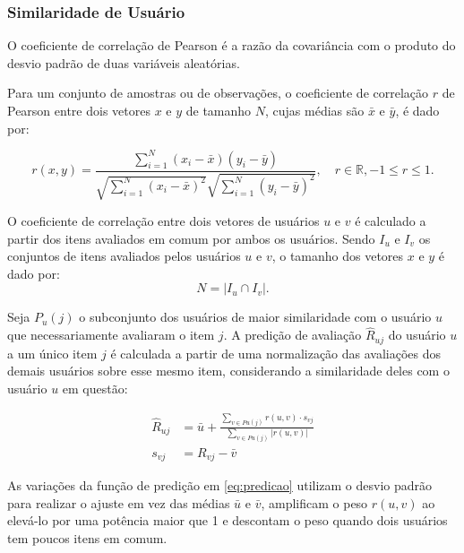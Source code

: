 \subsubsection{Similaridade de Usuário}
O coeficiente de correlação de Pearson é a razão da covariância com o produto
do desvio padrão de duas variáveis aleatórias.

Para um conjunto de amostras ou de observações, o coeficiente de
correlação $r$ de Pearson entre dois vetores $x$ e $y$ de tamanho $N$, cujas
médias são $\bar{x}$ e $\bar{y}$, é dado por:

\begin{equation}    
    r(x,y) = \frac{\sum_{i=1}^{N}(x_i - \bar{x})(y_i - \bar{y})}{\sqrt{\sum_{i=1}^{N}(x_i - \bar{x})^2} \sqrt{\sum_{i=1}^{N}(y_i - \bar{y})^2}}, \quad r \in \mathbb{R}, -1 \leq r \leq 1.
\end{equation}

O coeficiente de correlação entre dois vetores de usuários $u$ e $v$ é calculado
a partir dos itens avaliados em comum por ambos os usuários. Sendo $I_u$ e $I_v$
os conjuntos de itens avaliados pelos usuários $u$ e $v$,
o tamanho dos vetores $x$ e $y$ é dado por:
\begin{equation}
    N = |I_u \cap I_v|.
\end{equation}

Seja $P_u (j)$ o subconjunto dos usuários de maior similaridade com o usuário
$u$ que necessariamente avaliaram o item $j$. 
A predição de avaliação
$\hat{R}_{uj}$ do usuário $u$ a um único item $j$ é calculada a partir de uma
normalização das avaliações dos demais usuários sobre esse mesmo item,
considerando a similaridade deles com o usuário $u$ em questão:

\begin{align}
    \label{eq:predicao}
\hat{R}_{uj} &= \bar{u} + \frac{\sum_{v \in Pu(j)} r(u,v) \cdot s_{vj}}{\sum_{v \in Pu(j)} |r(u,v)|} \\
s_{vj} &= R_{vj} - \bar{v} \label{eq:centered_mean}
\end{align}

As variações da função de predição em \ref{eq:predicao} utilizam o desvio padrão
para realizar o ajuste em vez das médias $\bar{u}$ e $\bar{v}$, amplificam o
peso $r(u,v)$ ao elevá-lo por uma potência maior que 1 e descontam o peso quando
dois usuários tem poucos itens em comum.

